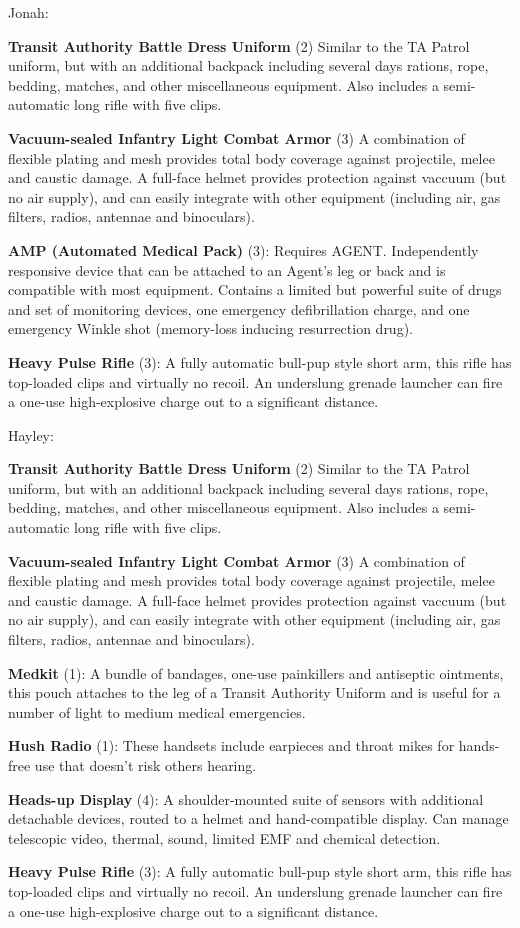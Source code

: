 Jonah:

{\parskip=0pt
\textbf{Transit Authority Battle Dress Uniform} (2) Similar to the TA Patrol uniform, but with an additional backpack including several days rations, rope, bedding, matches, and other miscellaneous equipment. Also includes a semi-automatic long rifle with five clips.

\textbf{Vacuum-sealed Infantry Light Combat Armor} (3) A combination of flexible plating and mesh provides total body coverage against projectile, melee and caustic damage. A full-face helmet provides protection against vaccuum (but no air supply), and can easily integrate with other equipment (including air, gas filters, radios, antennae and binoculars).

\textbf{AMP (Automated Medical Pack)} (3): Requires AGENT. Independently responsive device that can be attached to an Agent's leg or back and is compatible with most equipment. Contains a limited but powerful suite of drugs and set of monitoring devices, one emergency defibrillation charge, and one emergency Winkle shot (memory-loss inducing resurrection drug).

\textbf{Heavy Pulse Rifle }(3): A fully automatic bull-pup style short arm, this rifle has top-loaded clips and virtually no recoil. An underslung grenade launcher can fire a one-use high-explosive charge out to a significant distance.
}


Hayley:

{\parskip=0pt
\textbf{Transit Authority Battle Dress Uniform} (2) Similar to the TA Patrol uniform, but with an additional backpack including several days rations, rope, bedding, matches, and other miscellaneous equipment. Also includes a semi-automatic long rifle with five clips.

\textbf{Vacuum-sealed Infantry Light Combat Armor} (3) A combination of flexible plating and mesh provides total body coverage against projectile, melee and caustic damage. A full-face helmet provides protection against vaccuum (but no air supply), and can easily integrate with other equipment (including air, gas filters, radios, antennae and binoculars).

\textbf{Medkit} (1): A bundle of bandages, one-use painkillers and antiseptic ointments, this pouch attaches to the leg of a Transit Authority Uniform and is useful for a number of light to medium medical emergencies.

\textbf{Hush Radio} (1): These handsets include earpieces and throat mikes for hands-free use that doesn't risk others hearing.

\textbf{Heads-up Display} (4): A shoulder-mounted suite of sensors with additional detachable devices, routed to a helmet and hand-compatible display. Can manage telescopic video, thermal, sound, limited EMF and chemical detection.

\textbf{Heavy Pulse Rifle }(3): A fully automatic bull-pup style short arm, this rifle has top-loaded clips and virtually no recoil. An underslung grenade launcher can fire a one-use high-explosive charge out to a significant distance.

}


